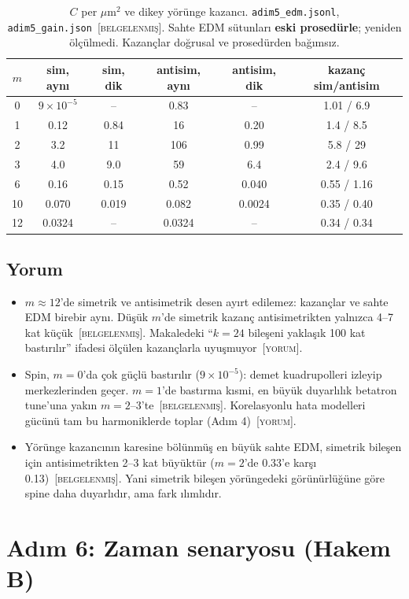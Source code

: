 \documentclass[11pt,a4paper]{article}
\newcommand{\kod}[1]{{\XeTeXinterchartokenstate=0\texttt{#1}}}
\newcommand{\BEL}{\textsc{[belgelenmiş]}}
\newcommand{\YOR}{\textsc{[yorum]}}
\begin{document}
\begin{table}[H]\centering\small
\caption{$C$ per $\mu$m$^2$ ve dikey yörünge kazancı. \kod{adim5\_edm.jsonl}, \kod{adim5\_gain.json}~\BEL. Sahte EDM sütunları \textbf{eski prosedürle}; yeniden ölçülmedi. Kazançlar doğrusal ve prosedürden bağımsız.}
\begin{tabular}{cccccc}
\toprule
$m$ & sim, aynı & sim, dik & antisim, aynı & antisim, dik & kazanç sim/antisim \\
\midrule
0 & $9\times10^{-5}$ & -- & 0.83 & -- & 1.01 / 6.9 \\
1 & 0.12 & 0.84 & 16 & 0.20 & 1.4 / 8.5 \\
2 & 3.2 & 11 & 106 & 0.99 & 5.8 / 29 \\
3 & 4.0 & 9.0 & 59 & 6.4 & 2.4 / 9.6 \\
6 & 0.16 & 0.15 & 0.52 & 0.040 & 0.55 / 1.16 \\
10 & 0.070 & 0.019 & 0.082 & 0.0024 & 0.35 / 0.40 \\
12 & 0.0324 & -- & 0.0324 & -- & 0.34 / 0.34 \\
\bottomrule
\end{tabular}
\end{table}

\subsection{Yorum}
\begin{itemize}
\item $m\approx12$'de simetrik ve antisimetrik desen ayırt edilemez: kazançlar ve sahte EDM birebir aynı.
Düşük $m$'de simetrik kazanç antisimetrikten yalnızca 4--7 kat küçük~\BEL. Makaledeki ``$k=24$ bileşeni
yaklaşık 100 kat bastırılır'' ifadesi ölçülen kazançlarla uyuşmuyor~\YOR.
\item Spin, $m=0$'da çok güçlü bastırılır ($9\times10^{-5}$): demet kuadrupolleri izleyip merkezlerinden
geçer. $m=1$'de bastırma kısmi, en büyük duyarlılık betatron tune'una yakın $m=2$--3'te~\BEL.
Korelasyonlu hata modelleri gücünü tam bu harmoniklerde toplar (Adım 4)~\YOR.
\item Yörünge kazancının karesine bölünmüş en büyük sahte EDM, simetrik bileşen için antisimetrikten
2--3 kat büyüktür ($m=2$'de 0.33'e karşı 0.13)~\BEL. Yani simetrik bileşen yörüngedeki görünürlüğüne göre
spine daha duyarlıdır, ama fark ılımlıdır.
\end{itemize}

\section{Adım 6: Zaman senaryosu (Hakem B)}
\end{document}
